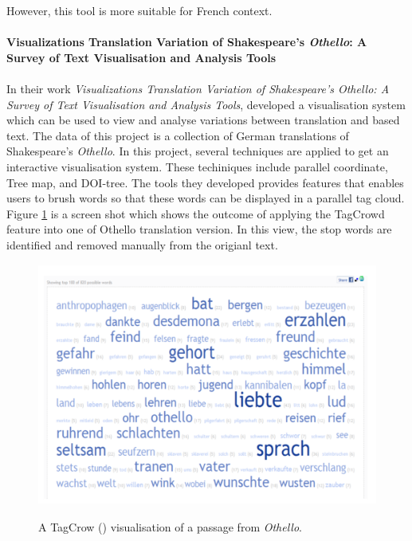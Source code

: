 However, this tool is more suitable for French context.

\paragraph{Visualizations Translation Variation of Shakespeare's \emph{Othello}: A Survey of Text Visualisation and Analysis Tools}
\paragraph[]{} In their work \emph{Visualizations Translation Variation of Shakespeare's Othello: A Survey of Text Visualisation and Analysis Tools}, \cite{Geng2011} developed a visualisation system which can be used to view and analyse variations between translation and based text. The data of this project is a collection of German translations of Shakespeare's \emph{Othello}. In this project, several techniques are applied to get an interactive visualisation system. These techiniques include parallel coordinate, Tree map, and DOI-tree. The tools they developed provides features that enables users to brush words so that these words can be displayed in  a parallel tag cloud. Figure \ref{fig:tagCloud} is a screen shot which shows the outcome of applying the TagCrowd feature into one of Othello translation version. In this view, the stop words are identified and removed manually from the origianl text.

\begin{figure}[h]
	\centering	
	\includegraphics[width=13cm, height=8cm]{Figs/Tagcloud}\\[1ex]
	\caption{A TagCrow (\cite{TagCrowd}) visualisation of a passage from \emph{Othello}. }
	\label{fig:tagCloud}
\end{figure} 


